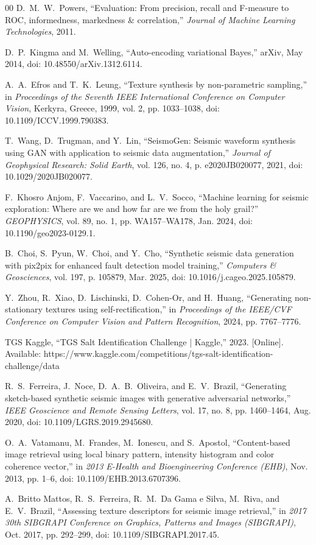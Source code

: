 \documentclass{ieeeaccess}
\begin{document}
\begin{thebibliography}{00}
D.~M.~W.~Powers, ``Evaluation: From precision, recall and F-measure to ROC, informedness, markedness \& correlation,'' \emph{Journal of Machine Learning Technologies}, 2011.

D.~P.~Kingma and M.~Welling, ``Auto-encoding variational Bayes,'' arXiv, May 2014, doi: 10.48550/arXiv.1312.6114.

A.~A.~Efros and T.~K.~Leung, ``Texture synthesis by non-parametric sampling,'' in \emph{Proceedings of the Seventh IEEE International Conference on Computer Vision}, Kerkyra, Greece, 1999, vol. 2, pp. 1033--1038, doi: 10.1109/ICCV.1999.790383.

T.~Wang, D.~Trugman, and Y.~Lin, ``SeismoGen: Seismic waveform synthesis using GAN with application to seismic data augmentation,'' \emph{Journal of Geophysical Research: Solid Earth}, vol. 126, no. 4, p. e2020JB020077, 2021, doi: 10.1029/2020JB020077.

F.~Khosro Anjom, F.~Vaccarino, and L.~V.~Socco, ``Machine learning for seismic exploration: Where are we and how far are we from the holy grail?'' \emph{GEOPHYSICS}, vol. 89, no. 1, pp. WA157--WA178, Jan. 2024, doi: 10.1190/geo2023-0129.1.

B.~Choi, S.~Pyun, W.~Choi, and Y.~Cho, ``Synthetic seismic data generation with pix2pix for enhanced fault detection model training,'' \emph{Computers \& Geosciences}, vol. 197, p. 105879, Mar. 2025, doi: 10.1016/j.cageo.2025.105879.

Y.~Zhou, R.~Xiao, D.~Lischinski, D.~Cohen-Or, and H.~Huang, ``Generating non-stationary textures using self-rectification,'' in \emph{Proceedings of the IEEE/CVF Conference on Computer Vision and Pattern Recognition}, 2024, pp. 7767--7776.

TGS Kaggle, ``TGS Salt Identification Challenge | Kaggle,'' 2023. [Online]. Available: https://www.kaggle.com/competitions/tgs-salt-identification-challenge/data

R.~S.~Ferreira, J.~Noce, D.~A.~B.~Oliveira, and E.~V.~Brazil, ``Generating sketch-based synthetic seismic images with generative adversarial networks,'' \emph{IEEE Geoscience and Remote Sensing Letters}, vol. 17, no. 8, pp. 1460--1464, Aug. 2020, doi: 10.1109/LGRS.2019.2945680.

O.~A.~Vatamanu, M.~Frandes, M.~Ionescu, and S.~Apostol, ``Content-based image retrieval using local binary pattern, intensity histogram and color coherence vector,'' in \emph{2013 E-Health and Bioengineering Conference (EHB)}, Nov. 2013, pp. 1--6, doi: 10.1109/EHB.2013.6707396.

A.~Britto Mattos, R.~S.~Ferreira, R.~M.~Da Gama e Silva, M.~Riva, and E.~V.~Brazil, ``Assessing texture descriptors for seismic image retrieval,'' in \emph{2017 30th SIBGRAPI Conference on Graphics, Patterns and Images (SIBGRAPI)}, Oct. 2017, pp. 292--299, doi: 10.1109/SIBGRAPI.2017.45.

\end{thebibliography}
\end{document}
